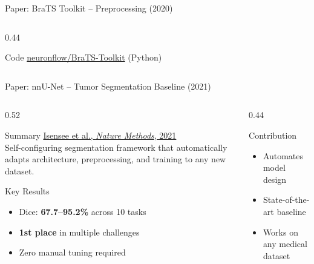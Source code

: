 \documentclass[aspectratio=169,xcolor=dvipsnames]{beamer}
\begin{document}
\begin{frame}{Paper: BraTS Toolkit -- Preprocessing (2020)}
\begin{columns}
\begin{column}{0.44\textwidth}
            \begin{exampleblock}{\scriptsize {} Code}
                \scriptsize \href{https://github.com/neuronflow/BraTS-Toolkit}{neuronflow/BraTS-Toolkit} (Python)
            \end{exampleblock}
        \end{column}
    \end{columns}
\end{frame}

\begin{frame}{Paper: nnU-Net -- Tumor Segmentation Baseline (2021)}
    \begin{columns}
        \begin{column}{0.52\textwidth}
            \begin{block}{Summary}
                \small
                \href{https://doi.org/10.1038/s41592-020-01008-z}{Isensee et al., \textit{Nature Methods}, 2021}\\[0.3em]
                Self-configuring segmentation framework that automatically adapts architecture, preprocessing, and training to any new dataset.
            \end{block}

            \vspace{0.2em}

            \begin{block}{Key Results}
                \small
                \begin{itemize}
                    \item Dice: \textbf{67.7--95.2\%} across 10 tasks
                    \item \textbf{1st place} in multiple challenges
                    \item Zero manual tuning required
                \end{itemize}
            \end{block}
        \end{column}

        \begin{column}{0.44\textwidth}
            \begin{block}{Contribution}
                \small
                \begin{itemize}
                    \item Automates model design
                    \item State-of-the-art baseline
                    \item Works on any medical dataset
                \end{itemize}
            \end{block}


\end{column}
\end{columns}
\end{frame}
\end{document}
